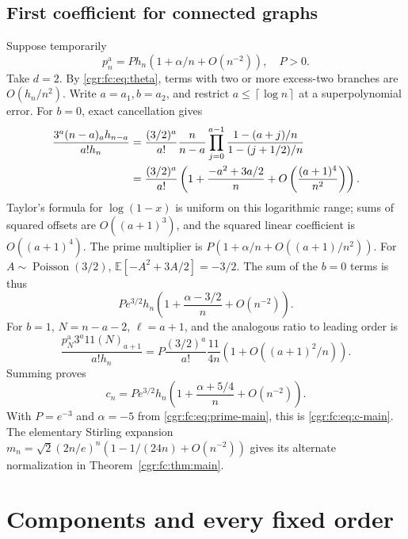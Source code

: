 \documentclass[11pt,letterpaper]{article}
\numberwithin{equation}{section}
\theoremstyle{definition}\newtheorem{definition}[theorem]{Definition}
\theoremstyle{remark}\newtheorem{remark}[theorem]{Remark}
\newcommand{\EE}{\mathbb E}
\newcommand{\ceil}[1]{\left\lceil #1\right\rceil}
\DeclareMathOperator{\Poi}{Poisson}
\begin{document}
\subsection{First coefficient for connected graphs}
Suppose temporarily
\begin{equation}\label{cgr:fc:eq:prime-alpha}
 p_n^{\mathrm a}=P h_n(1+\alpha/n+O(n^{-2})),\quad P>0.
\end{equation}
Take $d=2$. By \eqref{cgr:fc:eq:theta}, terms with two or more
excess-two branches are $O(h_n/n^2)$. Write $a=a_1,b=a_2$,
and restrict $a\le\ceil{\log n}$ at a superpolynomial error.
For $b=0$, exact cancellation gives
\begin{align}
 \frac{3^a(n-a)_a h_{n-a}}{a!h_n}
 &=\frac{(3/2)^a}{a!}\frac n{n-a}
   \prod_{j=0}^{a-1}
   \frac{1-(a+j)/n}{1-(j+1/2)/n}\notag\\
 &=\frac{(3/2)^a}{a!}
 \left(1+\frac{-a^2+3a/2}{n}
       +O\left(\frac{(a+1)^4}{n^2}\right)\right).
 \label{cgr:fc:eq:onebranch-exp}
\end{align}
Taylor's formula for $\log(1-x)$ is uniform on this logarithmic
range; sums of squared offsets are $O((a+1)^3)$, and the squared
linear coefficient is $O((a+1)^4)$.
The prime multiplier is
$P(1+\alpha/n+O((a+1)/n^2))$. For $A\sim\Poi(3/2)$,
$\EE[-A^2+3A/2]=-3/2$. The sum of the $b=0$ terms is thus
\[
 P e^{3/2}h_n\left(1+\frac{\alpha-3/2}{n}+O(n^{-2})\right).
\]
For $b=1$, $N=n-a-2$, $\ell=a+1$, and the analogous ratio to
leading order is
\[
 \frac{p_N^{\mathrm a}3^a11(N)_{a+1}}{a!h_n}
 =P\frac{(3/2)^a}{a!}\frac{11}{4n}
   \left(1+O((a+1)^2/n)\right).
\]
Summing proves
\begin{equation}\label{cgr:fc:eq:connected-transfer}
 c_n=P e^{3/2}h_n
       \left(1+\frac{\alpha+5/4}{n}+O(n^{-2})\right).
\end{equation}
With $P=e^{-3}$ and $\alpha=-5$ from \eqref{cgr:fc:eq:prime-main},
this is \eqref{cgr:fc:eq:c-main}. The elementary Stirling expansion
$m_n=\sqrt2(2n/e)^n(1-1/(24n)+O(n^{-2}))$ gives its alternate
normalization in Theorem~\ref{cgr:fc:thm:main}.

\section{Components and every fixed order}\label{cgr:fc:sec:allorders}
\end{document}
